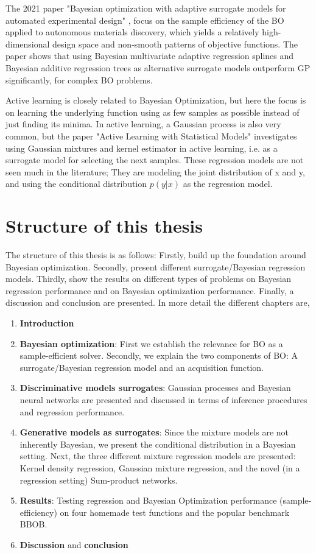 The 2021 paper "Bayesian optimization with adaptive surrogate models for automated experimental design"
\cite{Nature_BO_paper}, focus on the sample efficiency of the BO applied to autonomous materials discovery, 
which yields a relatively high-dimensional design space and non-smooth patterns of objective functions.  
The paper shows that using Bayesian multivariate adaptive regression splines
and Bayesian additive regression trees as alternative surrogate models outperform GP significantly, 
for complex BO problems. 

Active learning is closely related to Bayesian Optimization, but here the focus is on learning the
underlying function using as few samples as possible instead of just finding its minima. In active
learning, a Gaussian process is also very common, but the paper "Active Learning with Statistical
Models" \cite{ALStatisticalModels} investigates using Gaussian mixtures and kernel estimator in
active learning, i.e. as a surrogate model for selecting the next samples. These regression
models are not seen much in the literature; They are modeling the joint distribution of x and y, and
using the conditional distribution $p(y|x)$ as the regression model.

\section{Structure of this thesis}
The structure of this thesis is as follows: Firstly, build up the foundation around Bayesian
optimization. Secondly, present different surrogate/Bayesian regression models. Thirdly, show the
results on different types of problems on Bayesian regression performance and on Bayesian
optimization performance. Finally, a discussion and conclusion are presented. In more detail the different
chapters are, 

\begin{enumerate}[noitemsep]
    \item \textbf{Introduction}
    \item \textbf{Bayesian optimization}: First we establish the relevance for BO as a
    sample-efficient solver. Secondly, we explain the two components of BO: A 
    surrogate/Bayesian regression model and an acquisition function.
    \item \textbf{Discriminative models surrogates}: Gaussian processes and Bayesian neural
    networks are presented and discussed in terms of inference procedures and regression performance. 
    \item \textbf{Generative models as surrogates}: Since the mixture models are not 
    inherently Bayesian, we present the conditional distribution in a Bayesian setting. 
    Next, the three different mixture regression models are presented: Kernel density regression, Gaussian mixture regression,
    and the novel (in a regression setting) Sum-product networks.
    \item \textbf{Results}: Testing regression and Bayesian Optimization performance
    (sample-efficiency) on four homemade test functions and the popular benchmark BBOB.
    \item \textbf{Discussion} and \textbf{conclusion}
\end{enumerate}

